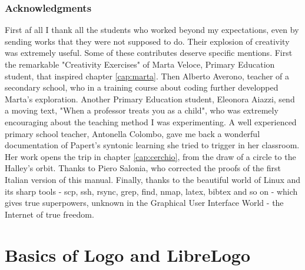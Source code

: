 \tableofcontents
\newpage

\section{Acknowledgments}

First af all I thank all the students who worked beyond my expectations, even by sending works that they were not supposed to do. Their explosion of creativity was extremely useful. Some of these contributes deserve specific mentions. First the remarkable "Creativity Exercises" of Marta Veloce, Primary Education student, that inspired chapter \ref{cap:marta}. Then Alberto Averono, teacher of a secondary school, who in a training course about coding further developped Marta's exploration. Another Primary Education student, Eleonora Aiazzi, send a moving text, "When a professor treats you as a child", who was extremely encouraging about the teaching method I was experimenting. A well experienced primary school teacher, Antonella Colombo, gave me back a wonderful documentation of Papert's syntonic learning she tried to trigger in her classroom. Her work opens the trip in chapter \ref{cap:cerchio}, from the draw of a circle to the Halley's orbit. Thanks to Piero Salonia, who corrected the proofs of the first Italian version of this manual. Finally, thanks to the beautiful world of Linux and its sharp tools  - scp, ssh, rsync, grep, find, nmap, latex, bibtex and so on - which gives true superpowers, unknown in the Graphical User Interface World - the Internet of true freedom.

\part{Basics of Logo and LibreLogo} \label{parte:manuale}

